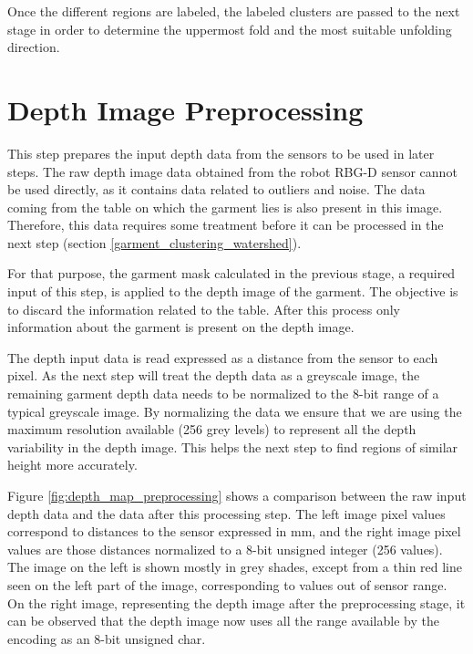 Once the different regions are labeled, the labeled clusters are passed to the next stage in order to determine the uppermost fold and the most suitable unfolding direction.

\section{Depth Image Preprocessing}
\label{depth_image_preprocessing}

This step prepares the input depth data from the sensors to be used in later steps. The raw depth image data obtained from the robot RBG-D sensor cannot be used directly, as it contains data related to outliers and noise. The data coming from the table on which the garment lies is also present in this image. Therefore, this data requires some treatment before it can be processed in the next step (section \ref{garment_clustering_watershed}). 

For that purpose, the garment mask calculated in the previous stage, a required input of this step, is applied to the depth image of the garment. The objective is to discard the information related to the table. After this process only information about the garment is present on the depth image.

The depth input data is read expressed as a distance from the sensor to each pixel. As the next step will treat the depth data as a greyscale image, the remaining garment depth data needs to be normalized to the 8-bit range of a typical greyscale image. By normalizing the data we ensure that we are using the maximum resolution available (256 grey levels) to represent all the depth variability in the depth image. This helps the next step to find regions of similar height more accurately.

Figure \ref{fig:depth_map_preprocessing}  shows a comparison between the raw input depth data and the data after this processing step. The left image pixel values correspond to distances to the sensor expressed in mm, and the right image pixel values are those distances normalized to a 8-bit unsigned integer (256 values). The image on the left is shown mostly in grey shades, except from a thin red line seen on the left part of the image, corresponding to values out of sensor range. On the right image, representing the depth image after the preprocessing stage, it can be observed that the depth image now uses all the range available by the encoding as an 8-bit unsigned char.

